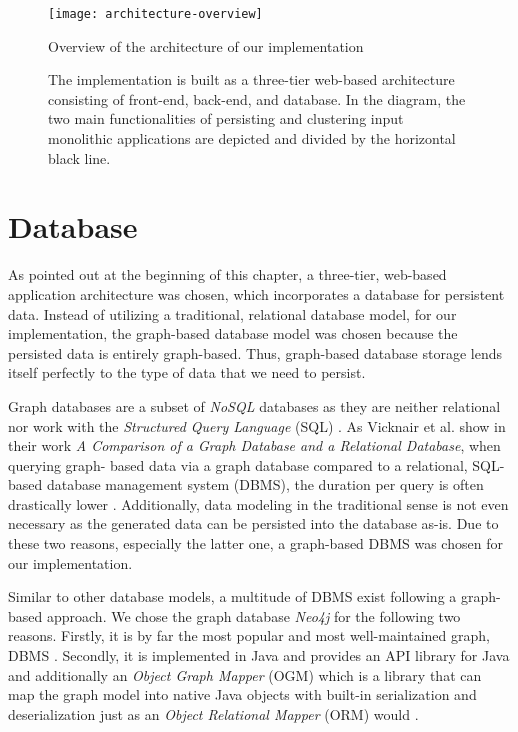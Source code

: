 \documentclass[12pt,a4paper]{report}
\begin{document}
\begin{figure}[htbp]
\centering
\texttt{[image: architecture-overview]}
\caption{Overview of the architecture of our implementation}
\caption*{\centering
    The implementation is built as a three-tier web-based architecture consisting of
    front-end, back-end, and database. In the diagram, the two main functionalities of
    persisting and clustering input monolithic applications are depicted and
    divided by the horizontal black line.
}
\label{fig:architecture-overview}
\end{figure}



\section{Database} \label{sect:implementation-database}

As pointed out at the beginning of this chapter, a three-tier, web-based
application architecture was chosen, which incorporates a database for
persistent data. Instead of utilizing a traditional, relational database model,
for our implementation, the graph-based database model was chosen because the
persisted data is entirely graph-based. Thus, graph-based database storage
lends itself perfectly to the type of data that we need to persist.

Graph databases are a subset of \textit{NoSQL} databases as they are neither
relational nor work with the \textit{Structured Query Language} (SQL) \cite{
vicknair2010graphdatabase}. As Vicknair et al. show in their work \textit{
A Comparison of a Graph Database and a Relational Database}, when querying graph\hyp
based data via a graph database compared to a relational, SQL-based database
management system (DBMS), the duration per query is often drastically lower
\cite{vicknair2010graphdatabase}. Additionally, data modeling in the
traditional sense is not even necessary as the generated data can be persisted
into the database as-is. Due to these two reasons, especially the latter one, a
graph-based DBMS was chosen for our implementation.

Similar to other database models, a multitude of DBMS exist following a graph\hyp
based approach. We chose the graph database \textit{Neo4j} for the following
two reasons. Firstly, it is by far the most popular and most well-maintained
graph, DBMS \cite{graph-dbms-ranking}. Secondly, it is implemented in Java and
provides an API library for Java and additionally an \textit{Object Graph
Mapper} (OGM) which is a library that can map the graph model into native Java
objects with built-in serialization and deserialization just as an \textit{
Object Relational Mapper} (ORM) would \cite{neo4j-ogm}.
\end{document}
